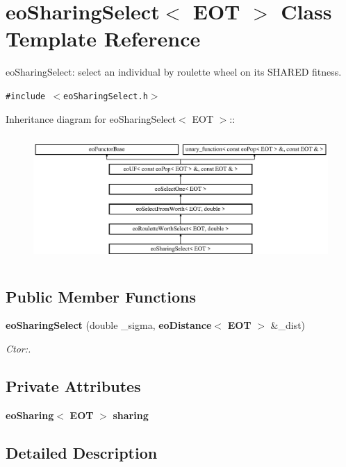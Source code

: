 \section{eo\-Sharing\-Select$<$ EOT $>$ Class Template Reference}
\label{classeo_sharing_select}
eo\-Sharing\-Select: select an individual by roulette wheel on its SHARED fitness.  


{\tt \#include $<$eo\-Sharing\-Select.h$>$}

Inheritance diagram for eo\-Sharing\-Select$<$ EOT $>$::\begin{figure}[H]
\begin{center}
\leavevmode
\includegraphics[height=4.85549cm]{classeo_sharing_select}
\end{center}
\end{figure}
\subsection*{Public Member Functions}
\begin{CompactItemize}
\item 
{\bf eo\-Sharing\-Select} (double \_\-sigma, {\bf eo\-Distance}$<$ {\bf EOT} $>$ \&\_\-dist)
\begin{CompactList}\small\item\em Ctor:. \item\end{CompactList}\end{CompactItemize}
\subsection*{Private Attributes}
\begin{CompactItemize}
\item 
{\bf eo\-Sharing}$<$ {\bf EOT} $>$ {\bf sharing}\label{classeo_sharing_select_r0}

\end{CompactItemize}


\subsection{Detailed Description}
